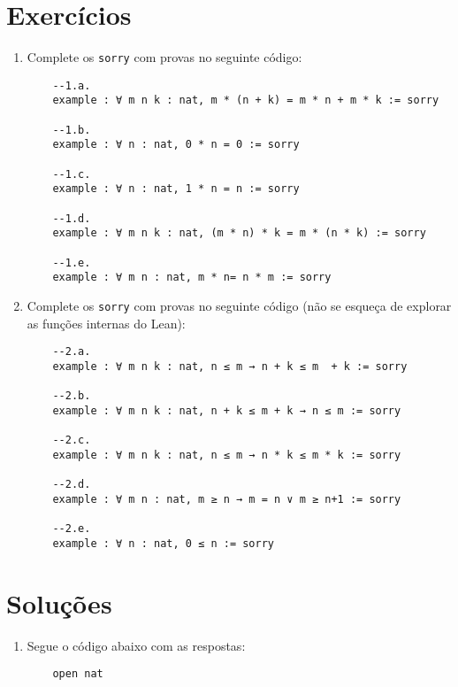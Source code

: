 \begin{center}
\section{Exercícios}

\begin{enumerate}
    \item Complete os \lstinline{sorry} com provas no seguinte código:
    
    \begin{lstlisting}
    --1.a.
    example : ∀ m n k : nat, m * (n + k) = m * n + m * k := sorry
    
    --1.b.
    example : ∀ n : nat, 0 * n = 0 := sorry
    
    --1.c.
    example : ∀ n : nat, 1 * n = n := sorry
    
    --1.d.
    example : ∀ m n k : nat, (m * n) * k = m * (n * k) := sorry
    
    --1.e.
    example : ∀ m n : nat, m * n= n * m := sorry
    \end{lstlisting}
    
    \item Complete os \lstinline{sorry} com provas no seguinte código (não se esqueça de explorar as funções internas do Lean):
    
    \begin{lstlisting}
    --2.a.
    example : ∀ m n k : nat, n ≤ m → n + k ≤ m  + k := sorry
    
    --2.b.
    example : ∀ m n k : nat, n + k ≤ m + k → n ≤ m := sorry
    
    --2.c.
    example : ∀ m n k : nat, n ≤ m → n * k ≤ m * k := sorry
    
    --2.d.
    example : ∀ m n : nat, m ≥ n → m = n ∨ m ≥ n+1 := sorry
    
    --2.e.
    example : ∀ n : nat, 0 ≤ n := sorry
    \end{lstlisting}
\end{enumerate}

\section{Soluções}

\begin{enumerate}
    
    \item Segue o código abaixo com as respostas:
    
    \begin{lstlisting}
    open nat
    

\end{lstlisting}
\end{enumerate}
\end{center}
